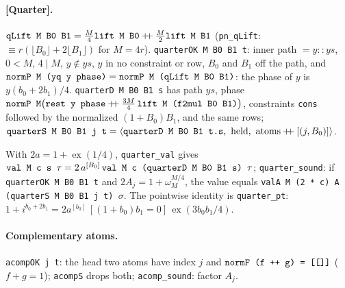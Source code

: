 \paragraph{[Quarter].} $\textnormal{\texttt{qLift M B0 B1}} = \frac M4\textnormal{\texttt{lift M B0}} \mathbin{+\!\!+}\frac M2\textnormal{\texttt{lift M B1}}$
(\textnormal{\texttt{pn\_\allowbreak{}qLift}}: $\equiv r(\lfloor B_0\rfloor+2\lfloor B_1\rfloor)$ for $M=4r$).
\textnormal{\texttt{quarterOK M B0 B1 t}}: inner path $=y::ys$, $0<M$, $4\mid M$, $y\notin ys$, $y$ in no constraint
or row, $B_0$ and $B_1$ off the path, and $\textnormal{\texttt{normP M (\allowbreak{}yq y phase)}} = \textnormal{\texttt{normP M (\allowbreak{}qLift M B0 B1)}}$:
the phase of $y$ is $y(b_0+2b_1)/4$.
\textnormal{\texttt{quarterD M B0 B1 s}} has path $ys$, phase
$\textnormal{\texttt{normP M}}\bigl(\textnormal{\texttt{rest y phase}}\mathbin{+\!\!+}\tfrac{3M}{4}\,\textnormal{\texttt{lift M (\allowbreak{}f2mul B0 B1)}}\bigr)$,
constraints \textnormal{\texttt{cons}} followed by the normalized $(1+B_0)B_1$, and the same rows; $\textnormal{\texttt{quarterS M B0 B1 j t}} = \langle\textnormal{\texttt{quarterD M B0 B1 t.\allowbreak{}s}},\ \text{held},\ \text{atoms}\mathbin{+\!\!+}[(j,B_0)]\rangle$.
\begin{theorem}
With $2a = 1+\operatorname{ex}(1/4)$,
\textnormal{\texttt{quarter\_\allowbreak{}val}} gives $\textnormal{\texttt{val M c s \ensuremath{\tau}}} = 2\,a^{[B_0]}\,\textnormal{\texttt{val M c (\allowbreak{}quarterD M B0 B1 s) \ensuremath{\tau}}}$;
\textnormal{\texttt{quarter\_\allowbreak{}sound}}: if \textnormal{\texttt{quarterOK M B0 B1 t}} and $2A_j = 1+\omega_M^{M/4}$, the value equals
\textnormal{\texttt{valA M (\allowbreak{}2 * c) A (\allowbreak{}quarterS M B0 B1 j t) \ensuremath{\sigma}}}. The pointwise identity is \textnormal{\texttt{quarter\_\allowbreak{}pt}}:
$1+i^{b_0+2b_1} = 2a^{[b_0]}\,[(1+b_0)b_1=0]\,\operatorname{ex}(3b_0b_1/4)$.
\end{theorem}

\paragraph{Complementary atoms.} \textnormal{\texttt{acompOK j t}}: the head two atoms have index $j$ and
$\textnormal{\texttt{normF (\allowbreak{}f ++ g) = [[]]}}$ ($f+g=1$); \textnormal{\texttt{acompS}} drops both; \textnormal{\texttt{acomp\_\allowbreak{}sound}}: factor $A_j$.

